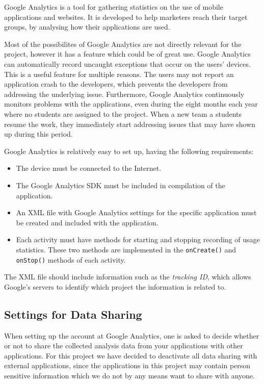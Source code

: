 Google Analytics is a tool for gathering statistics on the use of mobile applications and websites. 
It is developed to help marketers reach their target groups, by analysing how their applications are used.

Most of the possibilites of Google Analytics are not directly relevant for the \giraf project, however it has a feature which could be of great use.
Google Analytics can automatically record uncaught exceptions that occur on the users' devices.
This is a useful feature for multiple reasons. The users may not report an application crash to the developers, which prevents the developers from addressing the underlying issue. Furthermore, Google Analytics continuously monitors problems with the applications, even during the eight months each year where no students are assigned to the project. When a new team a students resume the work, they immediately start addressing issues that may have shown up during this period.

Google Analytics is relatively easy to set up, having the following requirements:
\begin{itemize}
\item The device must be connected to the Internet.
\item The Google Analytics SDK must be included in compilation of the application.
\item An XML file with Google Analytics settings for the specific application must be created and included with the application.
\item Each activity must have methods for starting and stopping recording of usage statistics. These two methods are implemented in the \lstinline{onCreate()} and \lstinline{onStop()} methods of each activity.
\end{itemize}
The XML file should include information such as the \textit{tracking ID}, which allows Google's servers to identify which project the information is related to.

\subsection{Settings for Data Sharing}
When setting up the account at Google Analytics, one is asked to decide whether or not to share the collected analysis data from your applications with other applications.
For this project we have decided to deactivate all data sharing with external applications, since the applications in this project may contain person sensitive information which we do not by any means want to share with anyone.

%
